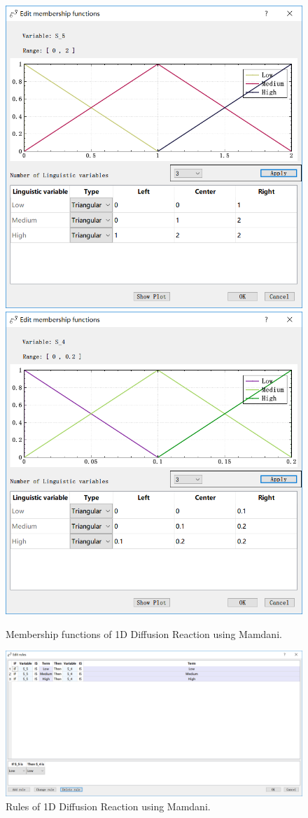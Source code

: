 \documentclass[journal,a4paper,onecolumn]{article}
\begin{document}
\begin{figure}[!hbt]
	\begin{center}
		\includegraphics[width=0.45\columnwidth]{fig31}
		\includegraphics[width=0.45\columnwidth]{fig32}
		\caption{Membership functions of 1D Diffusion Reaction using Mamdani.}
		\label{fig:Membership functions of 1D Diffusion Reaction using Mamdani.}
	\end{center}
\end{figure}

\begin{figure}[!hbt]
	\begin{center}
		\includegraphics[width=\columnwidth]{fig33}
		\caption{Rules of 1D Diffusion Reaction using Mamdani.}
		\label{fig:Rules of 1D Diffusion Reaction using Mamdani.}
	\end{center}
\end{figure}
\end{document}
